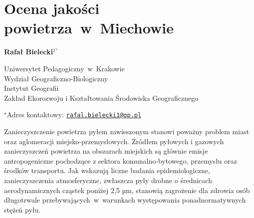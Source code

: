 \documentclass[\main/boa.tex]{subfiles}
\begin{document}
\sloppy
\section{Ocena jakości powietrza~w~Miechowie}

\begin{center}
  {\bf {} Rafał Bielecki$^{1^\star}$}
\end{center}

\vskip 0.3cm

\begin{affiliations}
\begin{enumerate}
\begin{minipage}{0.915\textwidth}
\centering
\item Uniwersytet Pedagogiczny~w~Krakowie \\ Wydział Geograficzno-Biologiczny  \\ Instytut Geografii \\
Zakład Ekorozwoju i Kształtowania Środowiska Geograficznego \\[-2pt]
\end{minipage}
\end{enumerate}
$^\star$Adres kontaktowy: \href{mailto:rafal.bielecki1@op.pl}{\nolinkurl{rafal.bielecki1@op.pl}}\\
\end{affiliations}

\vskip 0.5cm


\vskip 0.5cm

Zanieczyszczenie powietrza pyłem zawieszonym stanowi poważny problem miast oraz aglomeracji miejsko-przemysłowych. Źródłem pyłowych i gazowych zanieczyszczeń powietrza na obszarach miejskich są głównie emisje antropogeniczne pochodzące z sektora komunalno-bytowego, przemysłu oraz środków transportu. Jak wskazują liczne badania epidemiologiczne, zanieczyszczenia atmosferyczne, zwłaszcza pyły drobne o średnicach aerodynamicznych cząstek poniżej 2,5 µm, stanowią zagrożenie dla zdrowia osób długotrwale przebywających~w~warunkach występowania ponadnormatywnych stężeń pyłu.
\end{document}
